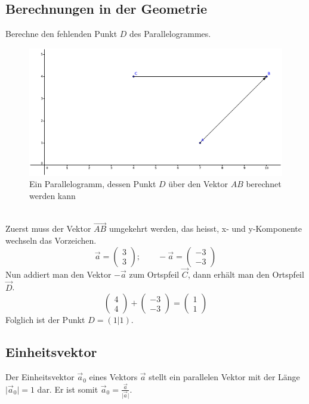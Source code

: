 \documentclass[12pt,a4paper]{scrbook}
\begin{document}
\subsection{Berechnungen in der Geometrie}
Berechne den fehlenden Punkt $D$ des Parallelogrammes.
\begin{figure}[h]
	\centering
	\includegraphics[scale=2]{img/vektor_parallelogramm.pdf}
	\caption{Ein Parallelogramm, dessen Punkt $D$ über den Vektor $AB$  berechnet werden kann}
\end{figure}\\
Zuerst muss der Vektor $\overrightarrow{AB}$ umgekehrt werden, das heisst, x- und y-Komponente wechseln das Vorzeichen.
\[ \vec{a} = \left(\begin{array}{c} 3\\ 3 \end{array}\right); \quad\quad  -\vec{a} = \left(\begin{array}{c} -3\\ -3 \end{array}\right)\]
Nun addiert man den Vektor $-\vec{a}$ zum Ortspfeil $\vec{C}$, dann erhält man den Ortspfeil $\vec{D}$.
\[ \left(\begin{array}{c}4\\4\end{array}\right) + \left(\begin{array}{c}-3\\-3\end{array}\right) = \left(\begin{array}{c}1\\1\end{array}\right) \]
Folglich ist der Punkt $D = (1 \vert 1)$.

\subsection{Einheitsvektor}
Der Einheitsvektor $\vec{a}_0$ eines Vektors $\vec{a}$ stellt ein parallelen Vektor mit der Länge $\vert \vec{a}_0 \vert = 1$ dar.
Er ist somit $\vec{a}_0 = \frac{\vec{a}}{\vert \vec{a} \vert}$.
\end{document}
